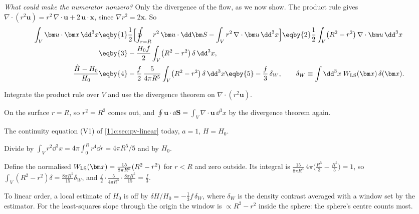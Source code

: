 \emph{What could make the numerator nonzero?} Only the divergence of the flow, as
we now show. The product rule gives $\nabla\cdot(r^2\bm u)=r^2\,\nabla\cdot\bm u+2\,\bm u\cdot\bm x$,
since $\nabla r^2=2\bm x$. So
\begin{align}
  \int_V\bm u\cdot\bm x\,\dd^3x
  &\eqby{1}\frac12\Bigl[\oint_{r=R}r^2\,\bm u\cdot\dd\bm S-\int_Vr^2\,\nabla\cdot\bm u\,\dd^3x\Bigr]
   \eqby{2}\frac12\int_V\bigl(R^2-r^2\bigr)\,\nabla\cdot\bm u\,\dd^3x
  \nonumber\\
  &\eqby{3}-\frac{H_0f}{2}\int_V\bigl(R^2-r^2\bigr)\,\delta\,\dd^3x,
  \nonumber\\
  \frac{\hat H-H_0}{H_0}
  &\eqby{4}-\frac{f}{2}\,\frac{5}{4\pi R^5}\int_V\bigl(R^2-r^2\bigr)\,\delta\,\dd^3x
   \eqby{5}-\frac{f}{3}\,\delta_W,
  \qquad
  \delta_W\equiv\int\dd^3x\;W_{\rm LS}(\bm x)\,\delta(\bm x).
  \label{11c:eq:dH-window}
\end{align}
\begin{explain}
  \item Integrate the product rule over $V$ and use the divergence theorem on
        $\nabla\cdot(r^2\bm u)$.
  \item On the surface $r=R$, so $r^2=R^2$ comes out, and
        $\oint\bm u\cdot\dd\bm S=\int_V\nabla\cdot\bm u\,\dd^3x$ by the divergence theorem
        again.
  \item The continuity equation (V1) of \cref{11c:sec:pv-linear} today, $a=1$,
        $H=H_0$.
  \item Divide by $\int_Vr^2\dd^3x=4\pi\int_0^Rr^4\dd r=4\pi R^5/5$ and by $H_0$.
  \item Define the normalised 
        $W_{\rm LS}(\bm x)=\frac{15}{8\pi R^5}(R^2-r^2)$ for $r<R$ and zero outside.
        Its integral is $\frac{15}{8\pi R^5}\,4\pi\bigl(\frac{R^5}{3}-\frac{R^5}{5}\bigr)=1$,
        so $\int_V(R^2-r^2)\delta=\frac{8\pi R^5}{15}\delta_W$, and
        $\frac f2\cdot\frac{5}{4\pi R^5}\cdot\frac{8\pi R^5}{15}=\frac f3$.
\end{explain}

\begin{keyidea}
To linear order, a local estimate of $H_0$ is off by
$\delta H/H_0=-\tfrac13 f\,\delta_W$, where $\delta_W$ is the density contrast
averaged with a window set by the estimator. For the least-squares slope through
the origin the window is $\propto R^2-r^2$ inside the sphere: the sphere's centre
counts most.
\end{keyidea}

